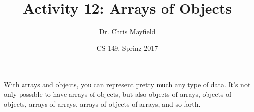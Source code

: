 \documentclass[12pt]{article}
\title{Activity 12: Arrays of Objects}
\author{Dr. Chris Mayfield}
\date{CS 149, Spring 2017}
\begin{document}
\maketitle

With arrays and objects, you can represent pretty much any type of data.
It's not only possible to have arrays of objects, but also objects of arrays, objects of objects, arrays of arrays, arrays of objects of arrays, and so forth.



\end{document}
